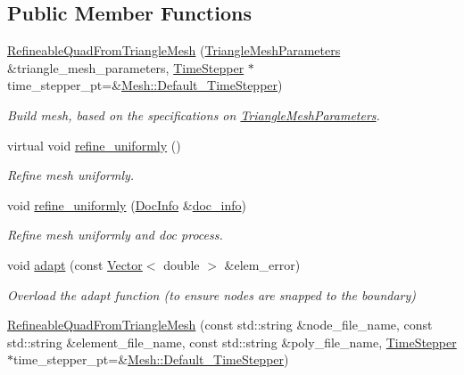 \subsection*{Public Member Functions}
\begin{DoxyCompactItemize}
\item 
\hyperlink{classoomph_1_1RefineableQuadFromTriangleMesh_a76122fefb9de7f79d3f8093f730c3dd4}{Refineable\+Quad\+From\+Triangle\+Mesh} (\hyperlink{classoomph_1_1TriangleMeshParameters}{Triangle\+Mesh\+Parameters} \&triangle\+\_\+mesh\+\_\+parameters, \hyperlink{classoomph_1_1TimeStepper}{Time\+Stepper} $\ast$time\+\_\+stepper\+\_\+pt=\&\hyperlink{classoomph_1_1Mesh_a12243d0fee2b1fcee729ee5a4777ea10}{Mesh\+::\+Default\+\_\+\+Time\+Stepper})
\begin{DoxyCompactList}\small\item\em Build mesh, based on the specifications on \hyperlink{classoomph_1_1TriangleMeshParameters}{Triangle\+Mesh\+Parameters}. \end{DoxyCompactList}\item 
virtual void \hyperlink{classoomph_1_1RefineableQuadFromTriangleMesh_a73e88bb8c1cc8464f079e928e89a4a14}{refine\+\_\+uniformly} ()
\begin{DoxyCompactList}\small\item\em Refine mesh uniformly. \end{DoxyCompactList}\item 
void \hyperlink{classoomph_1_1RefineableQuadFromTriangleMesh_ab78f50c13f9ccf7d1f359bc443fe2a9d}{refine\+\_\+uniformly} (\hyperlink{classoomph_1_1DocInfo}{Doc\+Info} \&\hyperlink{classoomph_1_1RefineableMeshBase_a266f8b2a1499cc2ae7b24b19813923ee}{doc\+\_\+info})
\begin{DoxyCompactList}\small\item\em Refine mesh uniformly and doc process. \end{DoxyCompactList}\item 
void \hyperlink{classoomph_1_1RefineableQuadFromTriangleMesh_a7d2efa292dd5dd4930e661fd32e42eec}{adapt} (const \hyperlink{classoomph_1_1Vector}{Vector}$<$ double $>$ \&elem\+\_\+error)
\begin{DoxyCompactList}\small\item\em Overload the adapt function (to ensure nodes are snapped to the boundary) \end{DoxyCompactList}\item 
\hyperlink{classoomph_1_1RefineableQuadFromTriangleMesh_aa2607a703a228947cc65d9edf0ca8b0e}{Refineable\+Quad\+From\+Triangle\+Mesh} (const std\+::string \&node\+\_\+file\+\_\+name, const std\+::string \&element\+\_\+file\+\_\+name, const std\+::string \&poly\+\_\+file\+\_\+name, \hyperlink{classoomph_1_1TimeStepper}{Time\+Stepper} $\ast$time\+\_\+stepper\+\_\+pt=\&\hyperlink{classoomph_1_1Mesh_a12243d0fee2b1fcee729ee5a4777ea10}{Mesh\+::\+Default\+\_\+\+Time\+Stepper})

\end{DoxyCompactItemize}
